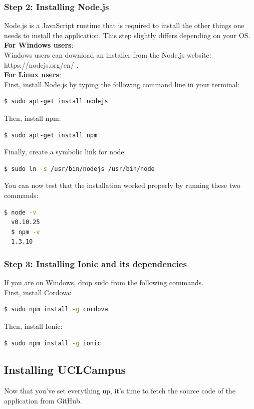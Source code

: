 \documentclass[11pt, a4paper]{report}
\begin{document}
\subsubsection{Step 2: Installing Node.js}

Node.js is a JavaScript runtime that is required to install the other things one needs to install the application. This step slightly differs depending on your OS.\\

\textbf{For Windows users}: \\
Windows users can download an installer from the Node.js website: https://nodejs.org/en/ .\\

\textbf{For Linux users}: \\
First, install Node.js by typing the following command line in your terminal:
\begin{lstlisting}[language=bash]
  $ sudo apt-get install nodejs
\end{lstlisting}
Then, install npm:
\begin{lstlisting}[language=bash]
  $ sudo apt-get install npm
\end{lstlisting}
Finally, create a symbolic link for node:
\begin{lstlisting}[language=bash]
  $ sudo ln -s /usr/bin/nodejs /usr/bin/node
\end{lstlisting}
You can now test that the installation worked properly by running these two commands:
\begin{lstlisting}[language=bash]
  $ node -v
  v0.10.25
  $ npm -v
  1.3.10
\end{lstlisting}
\subsubsection{Step 3: Installing Ionic and its dependencies}
If you are on Windows, drop sudo from the following commands.
\\First, install Cordova:
\begin{lstlisting}[language=bash]
   $ sudo npm install -g cordova
\end{lstlisting}
Then, install Ionic:
\begin{lstlisting}[language=bash]
   $ sudo npm install -g ionic
\end{lstlisting}
\subsection{Installing UCLCampus}
Now that you've set everything up, it's time to fetch the source code of the application from GitHub. 
\end{document}
